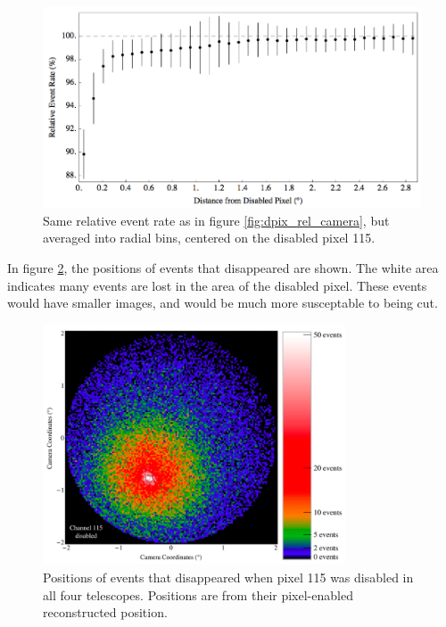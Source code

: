 \begin{figure}[ht]
  \begin{center}
    \includegraphics[width=\textwidth]{images/disabled_pixel/relativerate_radial}
    \caption[Radial Relative Event Rate]{Same relative event rate as in figure \ref{fig:dpix_rel_camera}, but averaged into radial bins, centered on the disabled pixel 115. }\label{fig:dpix_rel_radial}
  \end{center}
\end{figure}

In figure \ref{fig:dpix_disappear}, the positions of events that disappeared are shown.
The white area indicates many events are lost in the area of the disabled pixel.
These events would have smaller images, and would be much more susceptable to being cut.

\begin{figure}[ht]
  \begin{center}
    \includegraphics[width=0.8\textwidth]{images/disabled_pixel/disappearing_events}
    \caption[Disappering Events]{Positions of events that disappeared when pixel 115 was disabled in all four telescopes.  Positions are from their pixel-enabled reconstructed position.}\label{fig:dpix_disappear}
  \end{center}
\end{figure}


